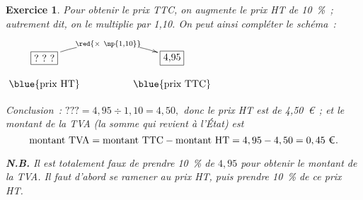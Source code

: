 \documentclass[10pt]{article}
\newtheorem{exo}{Exercice}
\begin{document}
\begin{exo}

Pour obtenir le prix TTC, on augmente le prix HT de 10~\%~; autrement dit, on le multiplie par 1,10. On peut ainsi compléter le schéma~:

\begin{center}
$\xymatrix@R=0.5pc@C=4pc{
    *+[F]+\txt{?~?~?} \ar@/^0.5cm/[r]|{\red{\times ~\np{1,10}}} & 
    *+[F]+\txt{4,95}  \\
    \txt{\blue{prix HT}}&
    \txt{\blue{prix TTC}}}$
    
    \end{center}
    
    \medskip
    
 Conclusion~: $???=4,95\div 1,10=4,50,$ donc le prix HT est de 4,50~\euro ~; et le montant de la TVA (la somme qui revient à l’État) est
 \[\text{montant TVA}=\text{montant TTC}-\text{montant HT}=4,95-4,50=0,45~\text{\euro}.\]


\medskip

\textbf{N.B.} Il est totalement faux de prendre 10~\% de $4,95$ pour obtenir le montant de la TVA. Il faut d'abord se ramener au prix HT, puis prendre 10~\% de ce prix HT.

\end{exo}
\end{document}
